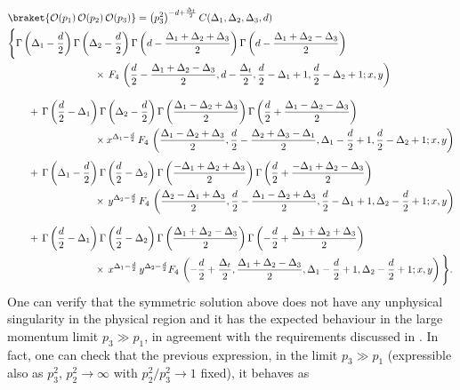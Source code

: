 \documentclass[a4paper,11pt,openright,twoside]{book}
\numberwithin{equation}{section}
\begin{document}
{\cite{Coriano:2013jba}
	\begin{align}
		&\braket{\mathcal{O}(p_1)\,\mathcal{O}(p_2)\,\mathcal{O}(p_3)}=\big(p_3^2\big)^{-d+\frac{\Delta_t}{2}}\,C(\Delta_1,\Delta_2,\Delta_3,d)\notag\\
		&\Bigg\{\Gamma\left(\Delta_1-\frac{d}{2}\right)\Gamma\left(\Delta_2-\frac{d}{2}\right)\Gamma\left(d-\frac{\Delta_1+\Delta_2+\Delta_3}{2}\right)\Gamma\left(d-\frac{\Delta_1+\Delta_2-\Delta_3}{2}\right)\notag\\
		&\hspace{3cm}\times
		\,F_4\,\left(\frac{d}{2}-\frac{\Delta_1+\Delta_2-\Delta_3}{2},d-\frac{\Delta_t}{2},\frac{d}{2}-\Delta_1+1,\frac{d}{2}-\Delta_2+1;x,y\right)\notag\\[2ex]
		&\qquad+\,
		\Gamma\left(\frac{d}{2}-\Delta_1\right)\Gamma\left(\Delta_2-\frac{d}{2}\right)\Gamma\left(\frac{\Delta_1-\Delta_2+\Delta_3}{2}\right)\Gamma\left(\frac{d}{2}+\frac{\Delta_1-\Delta_2-\Delta_3}{2}\right)\notag\\
		&\hspace{3cm}\times x^{\Delta_1-\frac{d}{2}}\,F_4\,\left(\frac{\Delta_1-\Delta_2+\Delta_3}{2},\frac{d}{2}-\frac{\Delta_2+\Delta_3-\Delta_1}{2},\Delta_1-\frac{d}{2}+1,\frac{d}{2}-\Delta_2+1;x,y\right)\notag
	\end{align}
	\begin{align}
		&\qquad+\,
		\Gamma\left(\Delta_1-\frac{d}{2}\right)\Gamma\left(\frac{d}{2}-\Delta_2\right)\Gamma\left(\frac{-\Delta_1+\Delta_2+\Delta_3}{2}\right)\Gamma\left(\frac{d}{2}+\frac{-\Delta_1+\Delta_2-\Delta_3}{2}\right)\notag\\
		&\hspace{3cm}\times\,y^{\Delta_2-\frac{d}{2}}\,F_4\,\left(\frac{\Delta_2-\Delta_1+\Delta_3}{2},\frac{d}{2}-\frac{\Delta_1-\Delta_2+\Delta_3}{2},\frac{d}{2}-\Delta_1+1,\Delta_2-\frac{d}{2}+1;x,y\right)\notag\\[2ex]
		&\qquad+\,
		\Gamma\left(\frac{d}{2}-\Delta_1\right)\Gamma\left(\frac{d}{2}-\Delta_2\right)\Gamma\left(\frac{\Delta_1+\Delta_2-\Delta_3}{2}\right)\Gamma\left(-\frac{d}{2}+\frac{\Delta_1+\Delta_2+\Delta_3}{2}\right)\notag\\
		&\hspace{3cm}\times\,x^{\Delta_1-\frac{d}{2}}\,y^{\Delta_2-\frac{d}{2}}F_4\,\left(-\frac{d}{2}+\frac{\Delta_t}{2},\frac{\Delta_1+\Delta_2-\Delta_3}{2},\Delta_1-\frac{d}{2}+1,\Delta_2-\frac{d}{2}+1;x,y\right)\Bigg\}.\label{solfin}
	\end{align}
	One can verify that the symmetric solution above does not have any unphysical singularity in the physical region and it has the expected behaviour in the large momentum limit $p_3\gg p_1$, in agreement with the requirements discussed in \cite{Bzowski:2014qja}. In fact, one can check that the previous expression, in the limit $p_3\gg p_1$ (expressible also as $p_3^2,\,p_2^2\to\infty$ with $p_2^2/p_3^2\to1$ fixed), it behaves as
}
\end{document}
